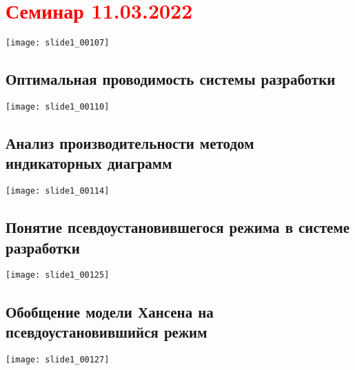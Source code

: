 \documentclass[main.tex]{subfiles}
\begin{document}
\section{\textcolor{red}{Семинар 11.03.2022}}

\texttt{[image: slide1\_00107]}



\subsection{Оптимальная проводимость системы разработки}

\texttt{[image: slide1\_00110]}



\subsection{Анализ производительности методом индикаторных диаграмм}

\texttt{[image: slide1\_00114]}










\subsection{Понятие псевдоустановившегося режима в системе разработки}

\texttt{[image: slide1\_00125]}


\subsection{Обобщение модели Хансена на псевдоустановившийся режим}

\texttt{[image: slide1\_00127]}








\end{document}
